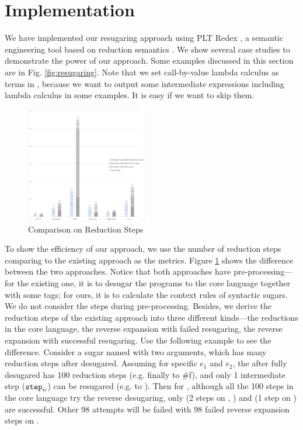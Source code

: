 \section{Implementation}
\label{sec4}


We have implemented our resugaring approach using PLT Redex \cite{SEwPR}, a semantic engineering tool based on reduction semantics \cite{reduction}. We show several case studies to demonstrate the power of our approach. Some examples discussed in this section are in Fig. \ref{fig:resugaring}. Note that we set call-by-value lambda calculus as terms in , because we want to output some intermediate expressions including lambda calculus in some examples. It is easy if we want to skip them.

\begin{figure}[t]
	\centering
	\includegraphics[width=0.471\textwidth]{images/efficiency.png}
	\caption{Comparison on Reduction Steps}
	\label{fig:step}
\end{figure}

To show the efficiency of our approach, we use the number of reduction steps comparing to the existing approach as the metrics. Figure \ref{fig:step} shows the difference between the two approaches. Notice that both approaches have pre-processing---for the existing one, it is to desugar the programs to the core language together with some tags; for ours, it is to calculate the context rules of syntactic sugars. We do not consider the steps during pre-processing. Besides, we derive the reduction steps of the existing approach into three different kinds---the reductions in the core language, the reverse expansion with failed resugaring, the reverse expansion with successful resugaring.  Use the following example to see the difference. Consider a sugar named  with two arguments, which has many reduction steps after desugared. Assuming for specific $e_1$ and $e_2$, the  after fully desugared has 100 reduction steps (e.g. finally to \#f), and only 1 intermediate step ($\mbox{\tt step}_n$) can be resugared (e.g. to ). Then for , although all the 100 steps in the core language try the reverse desugaring, only  (2 steps on , ) and  (1 step on ) are successful. Other 98 attempts will be failed with 98 failed reverse expansion steps on .

